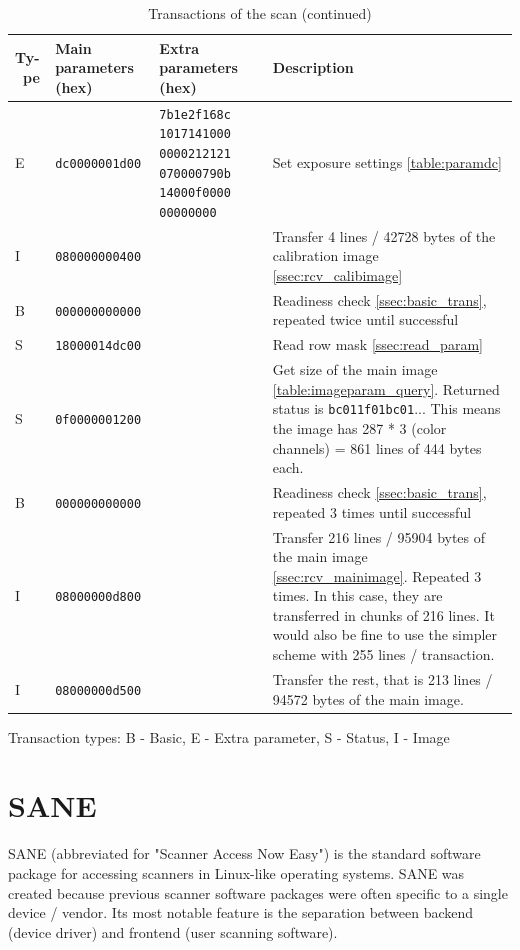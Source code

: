 \documentclass{article}
\begin{document}
\begin{table}[H]
  \caption{Transactions of the scan (continued)}
  \centering
  \begin{tabular}{p{0.4cm} | p{2.3cm} | p{2cm} | p{5cm}}
    Ty-\ pe & Main parameters (hex) & Extra parameters (hex) & Description \\ \hline
    E & {\tt dc0000001d00} & \tt 7b1e2f168c 1017141000 0000212121 070000790b 14000f0000 00000000
                           & Set exposure settings \autoref{table:paramdc} \\
    I & {\tt 080000000400} &  & Transfer 4 lines / 42728 bytes of the calibration image \ref{ssec:rcv_calibimage} \\
    B & {\tt 000000000000} &  & Readiness check \ref{ssec:basic_trans}, repeated twice until successful \\
    S & {\tt 18000014dc00} &  & Read row mask \ref{ssec:read_param} \\
    S & {\tt 0f0000001200} &  & Get size of the main image \autoref{table:imageparam_query}.
                                Returned status is {\tt bc011f01bc01}... This means the
                                image has 287 * 3 (color channels) = 861 lines of 444 bytes each. \\
    B & {\tt 000000000000} &  & Readiness check \ref{ssec:basic_trans}, repeated 3 times until successful \\
    I & {\tt 08000000d800} &  & Transfer 216 lines / 95904 bytes of the main image \ref{ssec:rcv_mainimage}.
                                Repeated 3 times.
                                In this case, they are transferred in chunks of 216 lines. It would also
                                be fine to use the simpler scheme with 255 lines / transaction. \\
    I & {\tt 08000000d500} &  & Transfer the rest, that is 213 lines / 94572 bytes of the main image. \\
  \end{tabular}
  
  \vspace{5mm} Transaction types: B - Basic, E - Extra parameter,
               S - Status, I - Image
\end{table}

\section{SANE}
\label{sec:sane}

SANE (abbreviated for "Scanner Access Now Easy") is the standard software package
for accessing scanners in Linux-like operating systems. SANE was created
because previous scanner software packages were often specific to a single device / vendor.
Its most notable feature is the separation between backend (device driver) 
and frontend (user scanning software).
\end{document}
